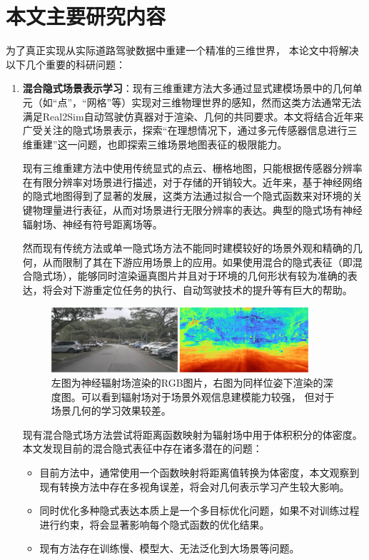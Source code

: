 \section{本文主要研究内容}
为了真正实现从实际道路驾驶数据中重建一个精准的三维世界， 本论文中将解决以下几个重要的科研问题：
\begin{enumerate}
    \item \textbf{混合隐式场景表示学习}：现有三维重建方法大多通过显式建模场景中的几何单元（如“点”，“网格”等）实现对三维物理世界的感知，然而这类方法通常无法满足Real2Sim自动驾驶仿真器对于渲染、几何的共同要求。本文将结合近年来广受关注的隐式场景表示，探索“在理想情况下，通过多元传感器信息进行三维重建”这一问题，也即探索三维场景地图表征的极限能力。

    现有三维重建方法中使用传统显式的点云、栅格地图，只能根据传感器分辨率在有限分辨率对场景进行描述，对于存储的开销较大。近年来，基于神经网络的隐式地图得到了显著的发展，这类方法通过拟合一个隐式函数来对环境的关键物理量进行表征，从而对场景进行无限分辨率的表达。典型的隐式场有神经辐射场、神经有符号距离场等。

    然而现有传统方法或单一隐式场方法不能同时建模较好的场景外观和精确的几何，从而限制了其在下游应用场景上的应用。如果使用混合的隐式表征（即混合隐式场），能够同时渲染逼真图片并且对于环境的几何形状有较为准确的表达，将会对下游重定位任务的执行、自动驾驶技术的提升等有巨大的帮助。
    
    \begin{figure}[t]
        \centering
        \includegraphics[width=0.9\textwidth]{undergraduate-thesis/images/RGB-D.pdf}
        \caption{左图为神经辐射场渲染的RGB图片，右图为同样位姿下渲染的深度图。可以看到辐射场对于场景外观信息建模能力较强， 但对于场景几何的学习效果较差。}
        \label{fig:rgb-d}
    \end{figure}
    
    现有混合隐式场方法尝试将距离函数映射为辐射场中用于体积积分的体密度\cite{wang_neus_2021, azinovic_neural_2022}。本文发现目前的混合隐式表征中存在诸多潜在的问题：
    \begin{itemize}
        \item 目前方法中，通常使用一个函数映射将距离值转换为体密度，本文观察到现有转换方法中存在多视角误差，将会对几何表示学习产生较大影响。
        \item 同时优化多种隐式表达本质上是一个多目标优化问题，如果不对训练过程进行约束，将会显著影响每个隐式函数的优化结果。
        \item 现有方法存在训练慢、模型大、无法泛化到大场景等问题。
    \end{itemize}
    

\end{enumerate}

